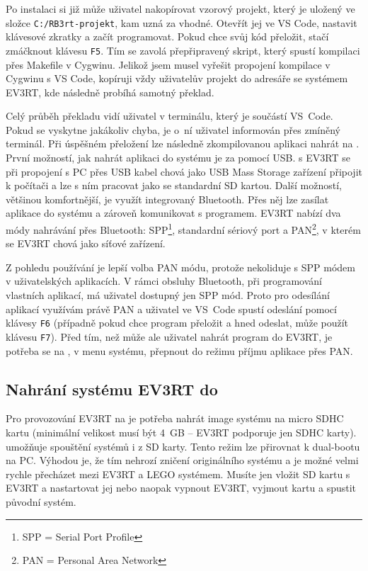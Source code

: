 Po instalaci si již může uživatel nakopírovat vzorový projekt, který je uložený ve složce \texttt{C:/RB3rt-projekt}, kam uzná za vhodné. 
Otevřít jej ve VS Code, nastavit klávesové zkratky a začít programovat.
Pokud chce svůj kód přeložit, stačí zmáčknout klávesu \texttt{F5}. 
Tím se zavolá přepřipravený skript, který spustí kompilaci přes Makefile v Cygwinu. 
Jelikož jsem musel vyřešit propojení kompilace v Cygwinu s VS Code, kopíruji vždy uživatelův projekt do adresáře se systémem EV3RT, kde následně probíhá samotný překlad.

Celý průběh překladu vidí uživatel v  terminálu, který je součástí VS~Code. 
Pokud se vyskytne jakákoliv chyba, je o~ní uživatel informován přes zmíněný terminál.
Při úspěšném přeložení lze následně zkompilovanou aplikaci nahrát na \EVbrick{}. 
První možností, jak nahrát aplikaci do systému je za pomocí USB. \brick{} s EV3RT se při propojení s PC přes USB kabel chová jako USB Mass Storage zařízení připojit k počítači a lze s ním pracovat jako se standardní SD kartou.
Další možností, většinou komfortnější, je využít integrovaný Bluetooth. 
Přes něj lze zasílat aplikace do systému a zároveň komunikovat s programem. 
EV3RT nabízí dva módy nahrávání přes Bluetooth: SPP\footnote{SPP = Serial Port Profile}, standardní sériový port a PAN\footnote{PAN = Personal Area Network}, v kterém se EV3RT chová jako síťové zařízení.

Z pohledu používání je lepší volba PAN módu, protože nekoliduje s SPP módem v uživatelských aplikacích. 
V rámci obsluhy Bluetooth, při programování vlastních aplikací, má uživatel dostupný jen SPP mód.
Proto pro odesílání aplikací využívám právě PAN a uživatel ve VS~Code spustí odeslání  pomocí klávesy \texttt{F6} (případně pokud chce program přeložit a hned odeslat, může použít klávesu \texttt{F7}).
Před tím, než může ale uživatel nahrát program do EV3RT, je potřeba se na , v menu systému, přepnout do režimu příjmu aplikace přes PAN.

\subsection{Nahrání systému EV3RT do }

Pro provozování EV3RT na  je potřeba nahrát image systému na micro SDHC kartu (minimální velikost musí být 4~GB -- EV3RT podporuje jen SDHC karty).
\EVbrick{} umožňuje spouštění systémů i z SD karty. Tento režim lze přirovnat k dual-bootu na PC. 
Výhodou je, že tím nehrozí zničení originálního systému a je možné velmi rychle přecházet mezi EV3RT a LEGO systémem. 
Musíte jen vložit SD kartu s EV3RT a nastartovat jej nebo naopak vypnout EV3RT, vyjmout kartu a spustit původní systém.

